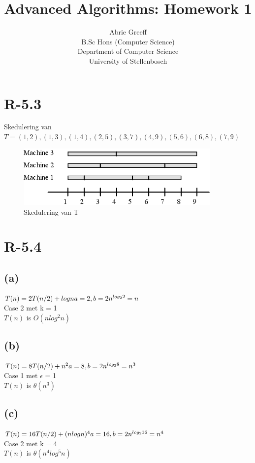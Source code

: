\documentclass[a4paper,11pt,titlepage]{article}
\author{Abrie Greeff\\B.Sc Hons (Computer Science)\\Department of Computer Science\\University of Stellenbosch}
\title{Advanced Algorithms: Homework 1}
\begin{document}
\maketitle
\tableofcontents
\section{R-5.3}
Skedulering van $T={(1,2),(1,3),(1,4),(2,5),(3,7),(4,9),(5,6),(6,8),(7,9)}$
\begin{figure}[htbp]
   \centering
   \includegraphics[width=10cm]{sched.png}
   \caption{Skedulering van T}
   \label{Figure:figex}
\end{figure}

\section{R-5.4}
\subsection{(a)}
$T(n) = 2T(n/2) + logn\\
a = 2, b = 2\\
n^{log_22} = n$\\
Case 2 met k = 1\\
$T(n)$ is $O(nlog^2n)$\\
\subsection{(b)}
$T(n) = 8T(n/2) + n^2\\
a = 8, b = 2\\
n^{log_28} = n^3$\\
Case 1 met $\epsilon$ = 1\\
$T(n)$ is $\theta(n^3)$\\
\subsection{(c)}
$T(n) = 16T(n/2) + (nlogn)^4\\
a = 16, b = 2\\
n^{log_216} = n^4$\\
Case 2 met k = 4\\
$T(n)$ is $\theta(n^4log^5n)$\\
\end{document}
